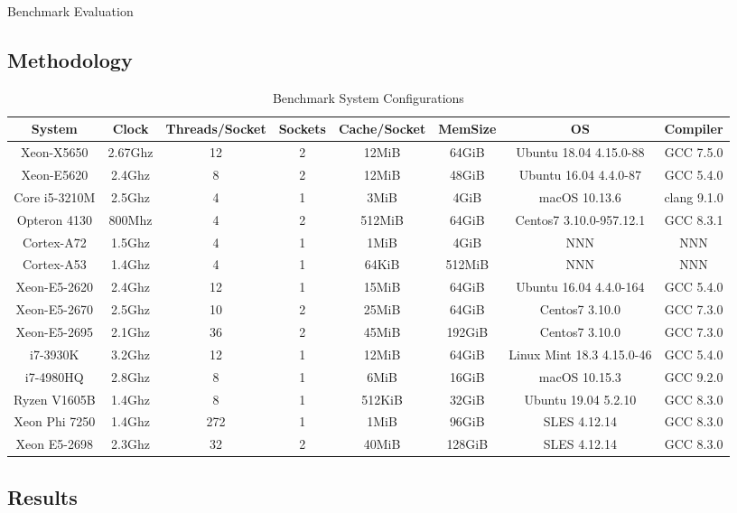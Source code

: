 
Benchmark Evaluation

\subsection{Methodology}
\label{subsec:methodology}

\begin{table}
\caption{Benchmark System Configurations}
\label{tab:benchsys}
\begin{tabular}{cccccccc}
\toprule
System&Clock&Threads/Socket&Sockets&Cache/Socket&MemSize&OS&Compiler\\
\midrule
Xeon-X5650&2.67Ghz&12&2&12MiB&64GiB&Ubuntu 18.04 4.15.0-88 & GCC 7.5.0\\
Xeon-E5620&2.4Ghz&8&2&12MiB&48GiB&Ubuntu 16.04 4.4.0-87 & GCC 5.4.0\\
Core i5-3210M&2.5Ghz&4&1&3MiB&4GiB&macOS 10.13.6&clang 9.1.0\\
Opteron 4130&800Mhz&4&2&512MiB&64GiB&Centos7 3.10.0-957.12.1&GCC 8.3.1\\
Cortex-A72&1.5Ghz&4&1&1MiB&4GiB&NNN&NNN\\
Cortex-A53&1.4Ghz&4&1&64KiB&512MiB&NNN&NNN\\
Xeon-E5-2620&2.4Ghz&12&1&15MiB&64GiB&Ubuntu 16.04 4.4.0-164&GCC 5.4.0\\
Xeon-E5-2670&2.5Ghz&10&2&25MiB&64GiB&Centos7 3.10.0&GCC 7.3.0\\
Xeon-E5-2695&2.1Ghz&36&2&45MiB&192GiB&Centos7 3.10.0&GCC 7.3.0\\
i7-3930K&3.2Ghz&12&1&12MiB&64GiB&Linux Mint 18.3 4.15.0-46&GCC 5.4.0\\
i7-4980HQ&2.8Ghz&8&1&6MiB&16GiB&macOS 10.15.3&GCC 9.2.0\\
Ryzen V1605B&1.4Ghz&8&1&512KiB&32GiB&Ubuntu 19.04 5.2.10&GCC 8.3.0\\
Xeon Phi 7250&1.4Ghz&272&1&1MiB&96GiB&SLES 4.12.14&GCC 8.3.0\\
Xeon E5-2698&2.3Ghz&32&2&40MiB&128GiB&SLES 4.12.14&GCC 8.3.0\\
\bottomrule
\end{tabular}
\end{table}


\subsection{Results}
\label{subsec:results}

